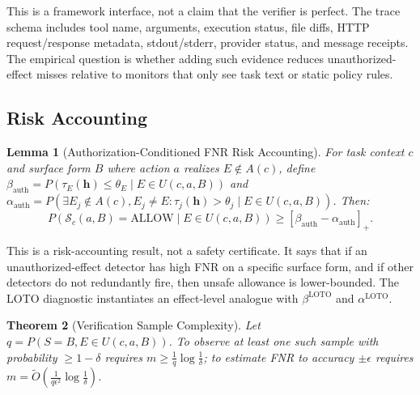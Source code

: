 \documentclass{article}
\newtheorem{theorem}{Theorem}[section]
\newtheorem{lemma}[theorem]{Lemma}
\begin{document}
\begin{center}
\end{center}

This is a framework interface, not a claim that the verifier is perfect. The trace schema includes tool name, arguments, execution status, file diffs, HTTP request/response metadata, stdout/stderr, provider status, and message receipts. The empirical question is whether adding such evidence reduces unauthorized-effect misses relative to monitors that only see task text or static policy rules.

\subsection{Risk Accounting}

\begin{lemma}[Authorization-Conditioned FNR Risk Accounting]
\label{thm:safety}
For task context $c$ and surface form $B$ where action $a$ realizes $E \notin A(c)$, define $\beta_{\text{auth}} = P(\tau_E(\mathbf{h}) \leq \theta_E \mid E \in U(c,a,B))$ and $\alpha_{\text{auth}} = P(\exists E_j \notin A(c), E_j \neq E: \tau_j(\mathbf{h}) > \theta_j \mid E \in U(c,a,B))$. Then:
$$P(\mathcal{S}_c(a, B) = \text{ALLOW} \mid E \in U(c,a,B)) \geq [\beta_{\text{auth}} - \alpha_{\text{auth}}]_+.$$
\end{lemma}

This is a risk-accounting result, not a safety certificate. It says that if an unauthorized-effect detector has high FNR on a specific surface form, and if other detectors do not redundantly fire, then unsafe allowance is lower-bounded. The LOTO diagnostic instantiates an effect-level analogue with $\beta^{\text{LOTO}}$ and $\alpha^{\text{LOTO}}$.

\begin{theorem}[Verification Sample Complexity]
\label{thm:sample}
Let $q = P(S=B, E \in U(c,a,B))$. To observe at least one such sample with probability $\geq 1-\delta$ requires $m \geq \frac{1}{q} \log \frac{1}{\delta}$; to estimate FNR to accuracy $\pm\epsilon$ requires $m = \tilde{O}\left(\frac{1}{q \epsilon^2} \log \frac{1}{\delta}\right)$.
\end{theorem}
\end{document}
